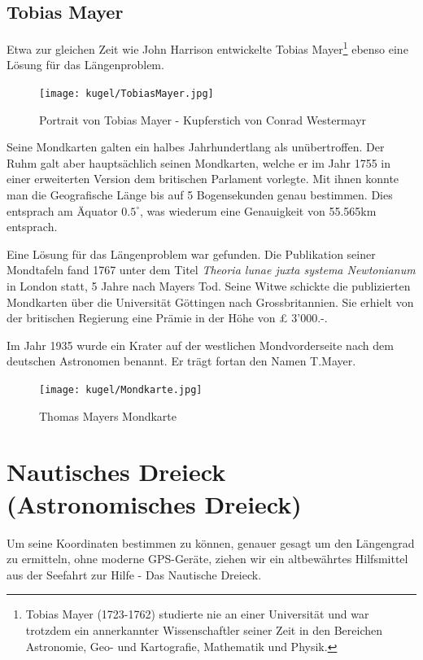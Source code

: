 \begin{refsection}
\subsection{Tobias Mayer}
Etwa zur gleichen Zeit wie John Harrison entwickelte Tobias Mayer\footnote{%
Tobias Mayer (1723-1762) studierte nie an einer Universität und war trotzdem ein annerkannter Wissenschaftler seiner Zeit in den Bereichen Astronomie, Geo- und Kartografie, Mathematik und Physik.}
ebenso eine Lösung für das Längenproblem.

\begin{figure}[htbp]
\centering
\texttt{[image: kugel/TobiasMayer.jpg]}
\caption{Portrait von Tobias Mayer - Kupferstich von Conrad Westermayr}
\end{figure}

Seine Mondkarten galten ein halbes Jahrhundertlang als unübertroffen. Der Ruhm galt aber hauptsächlich seinen Mondkarten, welche er im Jahr 1755 in einer erweiterten Version dem britischen Parlament vorlegte.
Mit ihnen konnte man die Geografische Länge bis auf 5 Bogensekunden genau bestimmen. Dies entsprach am Äquator $0.5 ^{\circ}$, was wiederum eine Genauigkeit von 55.565km entsprach.

Eine Lösung für das Längenproblem war gefunden. Die Publikation seiner Mondtafeln fand 1767 unter dem Titel \textit{Theoria lunae juxta systema Newtonianum} in London statt, 5 Jahre nach Mayers Tod. 
Seine Witwe schickte die publizierten Mondkarten über die Universität Göttingen nach Grossbritannien. Sie erhielt von der britischen Regierung eine Prämie in der Höhe von £ 3’000.-.

Im Jahr 1935 wurde ein Krater auf der westlichen Mondvorderseite nach dem deutschen Astronomen benannt. Er trägt fortan den Namen T.Mayer.

\begin{figure}[htbp]
\centering
\texttt{[image: kugel/Mondkarte.jpg]}
\caption{Thomas Mayers Mondkarte}
\end{figure}



\section{Nautisches Dreieck (Astronomisches Dreieck)}
Um seine Koordinaten bestimmen zu können, genauer gesagt um den Längengrad zu ermitteln, ohne moderne GPS-Geräte, ziehen wir ein altbewährtes Hilfsmittel aus der Seefahrt zur Hilfe - Das Nautische Dreieck.


\end{refsection}
